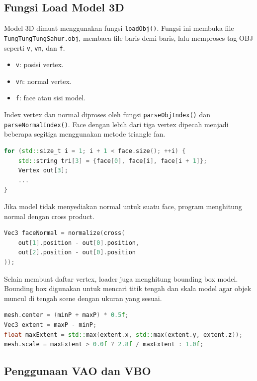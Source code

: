 \documentclass[12pt,a4paper]{article}
\begin{document}
\subsection{Fungsi Load Model 3D}

Model 3D dimuat menggunakan fungsi \texttt{loadObj()}. Fungsi ini membuka file
\texttt{TungTungTungSahur.obj}, membaca file baris demi baris, lalu memproses
tag OBJ seperti \texttt{v}, \texttt{vn}, dan \texttt{f}.

\begin{itemize}
    \item \texttt{v}: posisi vertex.
    \item \texttt{vn}: normal vertex.
    \item \texttt{f}: face atau sisi model.
\end{itemize}

Index vertex dan normal diproses oleh fungsi \texttt{parseObjIndex()} dan
\texttt{parseNormalIndex()}. Face dengan lebih dari tiga vertex dipecah menjadi
beberapa segitiga menggunakan metode triangle fan.

\begin{lstlisting}[language=C++]
for (std::size_t i = 1; i + 1 < face.size(); ++i) {
    std::string tri[3] = {face[0], face[i], face[i + 1]};
    Vertex out[3];
    ...
}
\end{lstlisting}

Jika model tidak menyediakan normal untuk suatu face, program menghitung normal
dengan cross product.

\begin{lstlisting}[language=C++]
Vec3 faceNormal = normalize(cross(
    out[1].position - out[0].position,
    out[2].position - out[0].position
));
\end{lstlisting}

Selain membuat daftar vertex, loader juga menghitung bounding box model.
Bounding box digunakan untuk mencari titik tengah dan skala model agar objek
muncul di tengah scene dengan ukuran yang sesuai.

\begin{lstlisting}[language=C++]
mesh.center = (minP + maxP) * 0.5f;
Vec3 extent = maxP - minP;
float maxExtent = std::max(extent.x, std::max(extent.y, extent.z));
mesh.scale = maxExtent > 0.0f ? 2.8f / maxExtent : 1.0f;
\end{lstlisting}

\subsection{Penggunaan VAO dan VBO}
\end{document}
